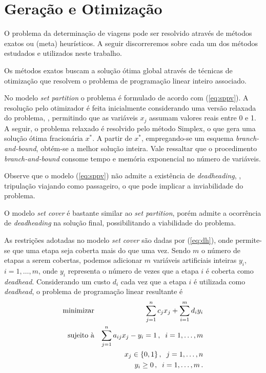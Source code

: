 \zerar
\chapter{Geração e Otimização}
\label{cap:geracao_e_otimizacao}

O problema da determinação de viagens pode ser resolvido através de métodos exatos ou (meta)
heurísticos. A seguir discorreremos sobre cada um dos métodos estudados e utilizados neste trabalho.

Os métodos exatos buscam a solução ótima global através de técnicas de otimização que resolvem o
problema de programação linear inteiro associado.

No modelo {\it set partition} o problema é formulado de acordo com (\ref{eq:sppv}). A resolução pelo
otimizador é feita inicialmente considerando uma versão relaxada do problema, \ie, permitindo que as
variáveis $x_j$ assumam valores reais entre 0 e 1. A seguir, o problema relaxado é resolvido pelo
método Simplex, o que gera uma solução ótima fracionária $x^\ast$. A partir de $x^\ast$,
empregando-se um esquema {\it branch-and-bound}, obtém-se a melhor solução inteira. Vale ressaltar
que o procedimento {\it branch-and-bound} consome tempo e memória exponencial no número de
variáveis.

Observe que o modelo (\ref{eq:sppv}) não admite a existência de {\it deadheading}, \ie, tripulação 
viajando como passageiro, o que pode implicar a inviabilidade do problema.

O modelo {\it set cover} é bastante similar ao {\it set partition}, porém admite a ocorrência de 
{\it deadheading} na solução final, possibilitando a viabilidade do problema.

As restrições adotadas no modelo {\it set cover} são dadas por (\ref{eq:dh}), onde permite-se que 
uma etapa seja coberta mais do que uma vez. Sendo $m$ o número de etapas a serem cobertas, podemos 
adicionar $m$ variáveis artificiais inteiras $y_i$, $i = 1, \ldots, m$, onde $y_i$ representa o 
número de vezes que a etapa $i$ é coberta como {\it deadhead}. Considerando um custo $d_i$ cada vez 
que a etapa $i$ é utilizada como {\it deadhead}, o problema de programação linear resultante é
%
\begin{eqnarray} \label{eq:scpdv}
	\text{minimizar} && \displaystyle \sum_{j=1}^n c_j x_j + \sum_{i=1}^m d_i y_i \nonumber \\
	\text{sujeito à} && \displaystyle \sum_{j=1}^n a_{ij} x_j - y_i = 1 \, , \;\; i = 1, \ldots, m \\
	                 && x_j \in \{0, 1\} \, , \;\; j = 1, \ldots, n \nonumber \\
	                 && y_i \geq 0 \, , \;\; i = 1, \ldots, m \, . \nonumber
\end{eqnarray}

